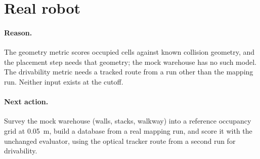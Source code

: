 \documentclass[11pt,a4paper,notitlepage]{report}
\begin{document}
\FloatBarrier
\section{Real robot}
\label{sec:map-real}


\paragraph{Reason.} The geometry metric scores occupied cells against known
collision geometry, and the placement step needs that geometry; the mock
warehouse has no such model. The drivability metric needs a tracked route from
a run other than the mapping run. Neither input exists at the cutoff.

\paragraph{Next action.} Survey the mock warehouse (walls, stacks, walkway)
into a reference occupancy grid at \SI{0.05}{\metre}, build a database from a
real mapping run, and score it with the unchanged evaluator, using the optical
tracker route from a second run for drivability.
\end{document}
